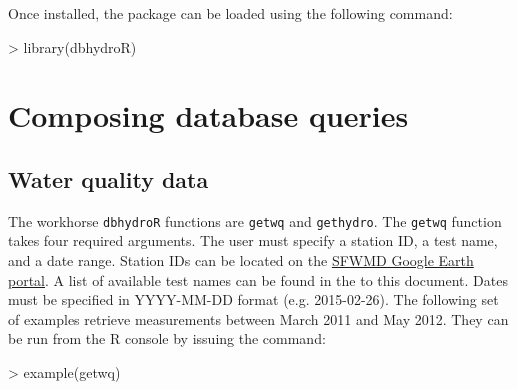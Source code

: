 \documentclass[12pt,notitlepage]{article}
\begin{document}
\vspace{8pt}

Once installed, the package can be loaded using the following command:



\begin{Schunk}
\begin{Sinput}
> library(dbhydroR)
\end{Sinput}
\end{Schunk}



\section{Composing database queries}
\subsection{Water quality data}

The workhorse \texttt{dbhydroR} functions are \verb|getwq| and \texttt{gethydro}. The \texttt{getwq} function takes four required arguments. The user must specify a station ID, a test name, and a date range. Station IDs can be located on the \href{http://my.sfwmd.gov/KMLEXT/CUSTOMKMLS/DBHydro/DBHydroKML/DBHYDRO_KML.kmz}{SFWMD Google Earth portal}. A list of available test names can be found in the  to this document. Dates must be specified in YYYY-MM-DD format (e.g. 2015-02-26).   The following set of examples retrieve measurements between March 2011 and May 2012. They can be run from the R console by issuing the command:

\begin{Schunk}
\begin{Sinput}
> example(getwq)
\end{Sinput}
\end{Schunk}
\end{document}
